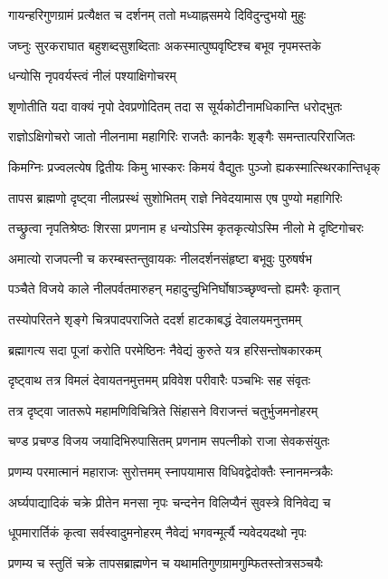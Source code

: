 \twolineshloka
{गायन्हरिगुणग्रामं प्रत्यैक्षत च दर्शनम्}
{ततो मध्याह्नसमये दिविदुन्दुभयो मुहुः}%

\twolineshloka
{जघ्नुः सुरकराघात बहुशब्दसुशब्दिताः}
{अकस्मात्पुष्पवृष्टिश्च बभूव नृपमस्तके}%

\onelineshloka
{धन्योसि नृपवर्यस्त्वं नीलं पश्याक्षिगोचरम्}%

\twolineshloka
{शृणोतीति यदा वाक्यं नृपो देवप्रणोदितम्}
{तदा स सूर्यकोटीनामधिकान्ति धरोद्भुतः}%

\twolineshloka
{राज्ञोऽक्षिगोचरो जातो नीलनामा महागिरिः}
{राजतैः कानकैः शृङ्गैः समन्तात्परिराजितः}%

\twolineshloka
{किमग्निः प्रज्वलत्येष द्वितीयः किमु भास्करः}
{किमयं वैद्युतः पुञ्जो ह्यकस्मात्स्थिरकान्तिधृक्}%

\twolineshloka
{तापस ब्राह्मणो दृष्ट्वा नीलप्रस्थं सुशोभितम्}
{राज्ञे निवेदयामास एष पुण्यो महागिरिः}%

\twolineshloka
{तच्छ्रुत्वा नृपतिश्रेष्ठः शिरसा प्रणनाम ह}
{धन्योऽस्मि कृतकृत्योऽस्मि नीलो मे दृष्टिगोचरः}%

\twolineshloka
{अमात्यो राजपत्नी च करम्बस्तन्तुवायकः}
{नीलदर्शनसंहृष्टा बभूवुः पुरुषर्षभ}%

\twolineshloka
{पञ्चैते विजये काले नीलपर्वतमारुहन्}
{महादुन्दुभिनिर्घोषाञ्च्छृण्वन्तो ह्यमरैः कृतान्}%

\twolineshloka
{तस्योपरितने शृङ्गे चित्रपादपराजिते}
{ददर्श हाटकाबद्धं देवालयमनुत्तमम्}%

\twolineshloka
{ब्रह्मागत्य सदा पूजां करोति परमेष्ठिनः}
{नैवेद्यं कुरुते यत्र हरिसन्तोषकारकम्}%

\twolineshloka
{दृष्ट्वाथ तत्र विमलं देवायतनमुत्तमम्}
{प्रविवेश परीवारैः पञ्चभिः सह संवृतः}%

\twolineshloka
{तत्र दृष्ट्वा जातरूपे महामणिविचित्रिते}
{सिंहासने विराजन्तं चतुर्भुजमनोहरम्}%

\twolineshloka
{चण्ड प्रचण्ड विजय जयादिभिरुपासितम्}
{प्रणनाम सपत्नीको राजा सेवकसंयुतः}%

\twolineshloka
{प्रणम्य परमात्मानं महाराजः सुरोत्तमम्}
{स्नापयामास विधिवद्वेदोक्तैः स्नानमन्त्रकैः}%

\twolineshloka
{अर्घ्यपाद्यादिकं चक्रे प्रीतेन मनसा नृपः}
{चन्दनेन विलिप्यैनं सुवस्त्रे विनिवेद्य च}%

\twolineshloka
{धूपमारार्तिकं कृत्वा सर्वस्वादुमनोहरम्}
{नैवेद्यं भगवन्मूर्त्यै न्यवेदयदथो नृपः}%

\twolineshloka
{प्रणम्य च स्तुतिं चक्रे तापसब्राह्मणेन च}
{यथामतिगुणग्रामगुम्फितस्तोत्रसञ्चयैः}%

